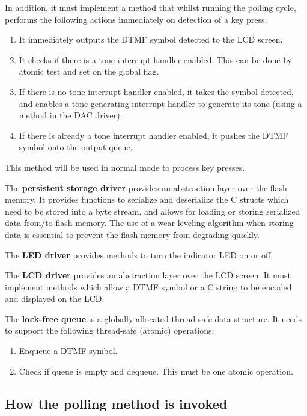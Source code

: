 \documentclass[11pt,a4paper,twocolumn]{scrartcl}
\begin{document}
In addition, it must implement a method that whilst running the polling cycle, performs the following actions immediately on detection of a key press:
\begin{enumerate}
   \item It immediately outputs the DTMF symbol detected to the LCD screen.
   \item It checks if there is a tone interrupt handler enabled. This can be done by atomic test and set on the global flag.
   \item If there is no tone interrupt handler enabled, it takes the symbol detected, and enables a tone-generating interrupt handler to generate its tone 
      (using a method in the DAC driver).
   \item If there is already a tone interrupt handler enabled, it pushes the DTMF symbol onto the output queue.
\end{enumerate}
This method will be used in normal mode to process key presses.

The \textbf{persistent storage driver} provides an abstraction layer over the flash memory. It provides functions to serialize and deserialize the C structs 
which need to be stored into a byte stream, and allows for loading or storing serialized data from/to flash memory. The use of a wear leveling algorithm when storing data is essential to prevent the flash memory from degrading quickly\cite{silberschatz2018operating}.

The \textbf{LED driver} provides methods to turn the indicator LED on or off.

The \textbf{LCD driver} provides an abstraction layer over the LCD screen. It must implement methods which allow a DTMF symbol or a C string to be encoded and
displayed on the LCD.

The \textbf{lock-free queue} is a globally allocated thread-safe data structure. It needs to support the following thread-safe (atomic) operations:
\begin{enumerate}
   \item Enqueue a DTMF symbol.
   \item Check if queue is empty and dequeue. This must be one atomic operation.
\end{enumerate}

\subsection{How the polling method is invoked} \label{polling-method}
\end{document}
